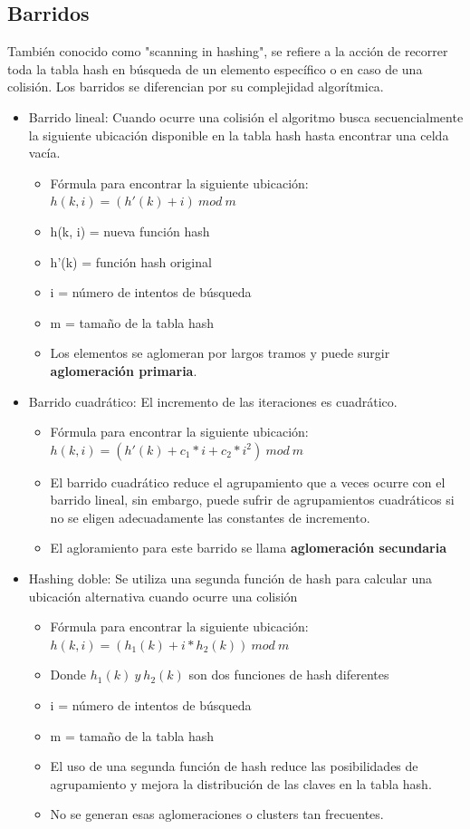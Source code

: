 \documentclass[10pt,a4paper]{article}
\begin{document}
\subsection*{Barridos}
También conocido como "scanning in hashing", se refiere a la acción de recorrer toda la tabla hash en búsqueda de un elemento específico o en caso de una colisión. Los barridos se diferencian por su complejidad algorítmica.
\begin{itemize}
    \item Barrido lineal: Cuando ocurre una colisión el algoritmo busca secuencialmente la siguiente ubicación disponible en la tabla hash hasta encontrar una celda vacía.
    \begin{itemize}
        \item Fórmula para encontrar la siguiente ubicación: $h(k, i) = (h'(k)+i) \ mod \ m$
        \item h(k, i) = nueva función hash 
        \item h'(k) = función hash original
        \item i = número de intentos de búsqueda 
        \item m = tamaño de la tabla hash
        \item Los elementos se aglomeran por largos tramos y puede surgir \textbf{aglomeración primaria}.
    \end{itemize}
    \item Barrido cuadrático: El incremento de las iteraciones es cuadrático.
    \begin{itemize}
        \item Fórmula para encontrar la siguiente ubicación: $h(k,i) = (h'(k) + c_{1} \ast i + c_{2} \ast i^{2}) \ mod \ m$
        \item El barrido cuadrático reduce el agrupamiento que a veces ocurre con el barrido lineal, sin embargo, puede sufrir de agrupamientos cuadráticos si no se eligen adecuadamente las constantes de incremento.
        \item El agloramiento para este barrido se llama \textbf{aglomeración secundaria}
    \end{itemize}
    \item Hashing doble: Se utiliza una segunda función de hash para calcular una ubicación alternativa cuando ocurre una colisión 
    \begin{itemize}
        \item Fórmula para encontrar la siguiente ubicación: $h(k, i) = (h_{1}(k) + i \ast h_{2}(k)) \ mod \ m$
        \item Donde $h_{1}(k) \ y \ h_{2}(k)$ son dos funciones de hash diferentes
        \item i = número de intentos de búsqueda 
        \item m = tamaño de la tabla hash
        \item El uso de una segunda función de hash reduce las posibilidades de agrupamiento y mejora la distribución de las claves en la tabla hash. 
        \item No se generan esas aglomeraciones o clusters tan frecuentes.
    \end{itemize}
\end{itemize}
\end{document}
